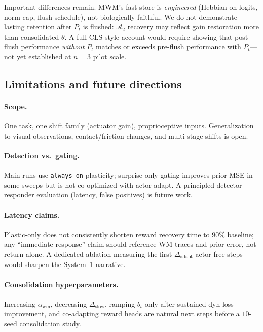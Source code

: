 Important differences remain.
MWM's fast store is \emph{engineered} (Hebbian on logits, norm cap, flush schedule), not biologically faithful.
We do not demonstrate lasting retention after $P_t$ is flushed: $\mathcal{A}_2$ recovery may reflect gain restoration more than consolidated $\theta$.
A full CLS-style account would require showing that post-flush performance \emph{without} $P_t$ matches or exceeds pre-flush performance with $P_t$---not yet established at $n{=}3$ pilot scale.

\subsection{Limitations and future directions}
\label{sec:disc-future}

\paragraph{Scope.}
One task, one shift family (actuator gain), proprioceptive inputs.
Generalization to visual observations, contact/friction changes, and multi-stage shifts is open.

\paragraph{Detection vs.\ gating.}
Main runs use \texttt{always\_on} plasticity; surprise-only gating improves prior MSE in some sweeps but is not co-optimized with actor adapt.
A principled detector--responder evaluation (latency, false positives) is future work.

\paragraph{Latency claims.}
Plastic-only does not consistently shorten reward recovery time to $90\%$ baseline; any ``immediate response'' claim should reference WM traces and prior error, not return alone.
A dedicated ablation measuring the first $\Delta_{\mathrm{adapt}}$ actor-free steps would sharpen the System~1 narrative.

\paragraph{Consolidation hyperparameters.}
Increasing $\alpha_{\mathrm{wm}}$, decreasing $\Delta_{\mathrm{slow}}$, ramping $b_t$ only after sustained dyn-loss improvement, and co-adapting reward heads are natural next steps before a $10$-seed consolidation study.

